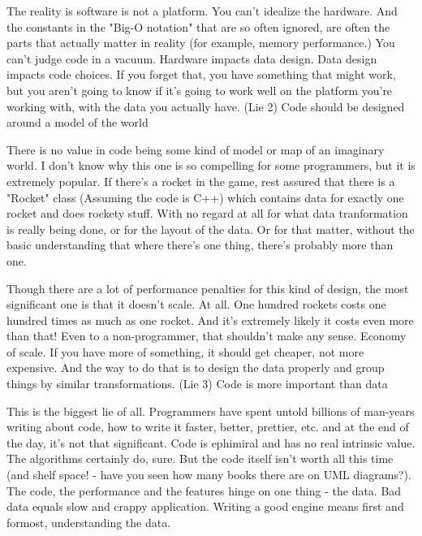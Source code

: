 The reality is software is not a platform. You can't idealize the hardware. And
the constants in the "Big-O notation" that are so often ignored, are often the
parts that actually matter in reality (for example, memory performance.) You
can't judge code in a vacuum. Hardware impacts data design. Data design impacts
code choices. If you forget that, you have something that might work, but you
aren't going to know if it's going to work well on the platform you're working
with, with the data you actually have. (Lie 2) Code should be designed around a
model of the world

There is no value in code being some kind of model or map of an imaginary world.
I don't know why this one is so compelling for some programmers, but it is
extremely popular. If there's a rocket in the game, rest assured that there is a
"Rocket" class (Assuming the code is C++) which contains data for exactly one
rocket and does rockety stuff. With no regard at all for what data tranformation
is really being done, or for the layout of the data. Or for that matter, without
the basic understanding that where there's one thing, there's probably more than
one.

Though there are a lot of performance penalties for this kind of design, the
most significant one is that it doesn't scale. At all. One hundred rockets costs
one hundred times as much as one rocket. And it's extremely likely it costs even
more than that! Even to a non-programmer, that shouldn't make any sense. Economy
of scale. If you have more of something, it should get cheaper, not more
expensive. And the way to do that is to design the data properly and group
things by similar transformations. (Lie 3) Code is more important than data

This is the biggest lie of all. Programmers have spent untold billions of
man-years writing about code, how to write it faster, better, prettier, etc. and
at the end of the day, it's not that significant. Code is ephimiral and has no
real intrinsic value. The algorithms certainly do, sure. But the code itself
isn't worth all this time (and shelf space! - have you seen how many books there
are on UML diagrams?). The code, the performance and the features hinge on one
thing - the data. Bad data equals slow and crappy application. Writing a good
engine means first and formost, understanding the data.






















